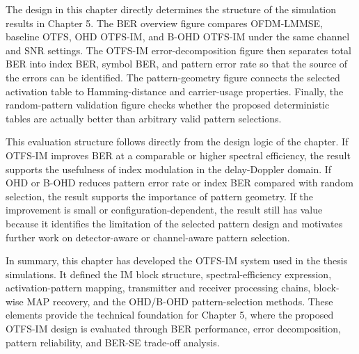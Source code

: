 The design in this chapter directly determines the structure of the simulation results in Chapter 5. The BER overview figure compares OFDM-LMMSE, baseline OTFS, OHD OTFS-IM, and B-OHD OTFS-IM under the same channel and SNR settings. The OTFS-IM error-decomposition figure then separates total BER into index BER, symbol BER, and pattern error rate so that the source of the errors can be identified. The pattern-geometry figure connects the selected activation table to Hamming-distance and carrier-usage properties. Finally, the random-pattern validation figure checks whether the proposed deterministic tables are actually better than arbitrary valid pattern selections.

This evaluation structure follows directly from the design logic of the chapter. If OTFS-IM improves BER at a comparable or higher spectral efficiency, the result supports the usefulness of index modulation in the delay-Doppler domain. If OHD or B-OHD reduces pattern error rate or index BER compared with random selection, the result supports the importance of pattern geometry. If the improvement is small or configuration-dependent, the result still has value because it identifies the limitation of the selected pattern design and motivates further work on detector-aware or channel-aware pattern selection.

In summary, this chapter has developed the OTFS-IM system used in the thesis simulations. It defined the IM block structure, spectral-efficiency expression, activation-pattern mapping, transmitter and receiver processing chains, block-wise MAP recovery, and the OHD/B-OHD pattern-selection methods. These elements provide the technical foundation for Chapter 5, where the proposed OTFS-IM design is evaluated through BER performance, error decomposition, pattern reliability, and BER-SE trade-off analysis.

\newpage
